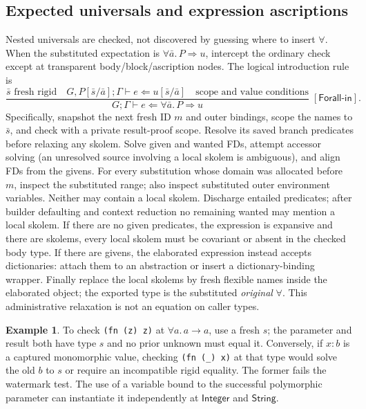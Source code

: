 \documentclass[11pt]{article}
\theoremstyle{definition}
\newtheorem{example}[theorem]{Example}
\newcommand{\code}[1]{\texttt{#1}}
\newcommand{\Int}{\mathsf{Integer}}
\newcommand{\Str}{\mathsf{String}}
\newcommand{\chk}{\mathrel{\Leftarrow}}
\newcommand{\arr}{\mathbin{\to}}
\newcommand{\rrule}[3]{\frac{\displaystyle #2}{\displaystyle #3}
                       \;{\scriptstyle[\textsf{#1}]}}
\begin{document}
\subsection{Expected universals and expression ascriptions}\label{sec:rank}
Nested universals are checked, not discovered by guessing where to insert
$\forall$. When the substituted expectation is $\forall\bar a.\,P\Rightarrow u$,
intercept the ordinary check except at transparent body/block/ascription
nodes. The logical introduction rule is
\[
 \rrule{Forall-in}{\bar s\text{ fresh rigid}\quad
       G,P[\bar s/\bar a];\Gamma\vdash e\chk u[\bar s/\bar a]
       \quad\text{scope and value conditions}}
      {G;\Gamma\vdash e\chk\forall\bar a.\,P\Rightarrow u}.
\]
Specifically, snapshot the next fresh ID $m$ and outer bindings, scope the
names to $\bar s$, and check with a private result-proof scope. Resolve its
saved branch predicates before relaxing any skolem. Solve given and wanted
FDs, attempt accessor solving (an unresolved source involving a local
skolem is ambiguous), and align FDs from the givens. For every substitution
whose domain was allocated before $m$, inspect the substituted range; also
inspect substituted outer environment variables. Neither may contain a
local skolem. Discharge entailed predicates; after builder defaulting and
context reduction no remaining wanted may mention a local skolem.
If there are no given predicates, the expression is expansive and there
are skolems, every local skolem must be covariant or absent in the checked
body type. If there are givens, the elaborated expression instead accepts
dictionaries: attach them to an abstraction or insert a dictionary-binding
wrapper. Finally replace the local skolems by fresh flexible names inside
the elaborated object; the exported type is the substituted \emph{original}
$\forall$. This administrative relaxation is not an equation on caller types.

\begin{example}
To check \code{(fn (z) z)} at $\forall a.\,a\arr a$, use a fresh $s$;
the parameter and result both have type $s$ and no prior unknown must
equal it. Conversely, if $x:b$ is a captured monomorphic value, checking
\code{(fn (\_) x)} at that type would solve the old $b$ to $s$ or require
an incompatible rigid equality. The former fails the watermark test.
The use of a variable bound to the successful polymorphic parameter can
instantiate it independently at $\Int$ and $\Str$.
\end{example}
\end{document}
